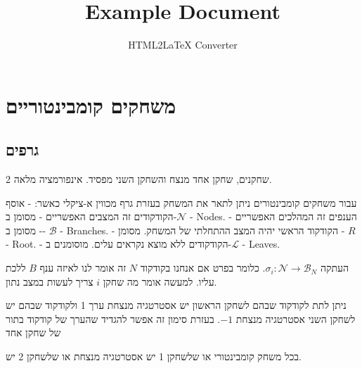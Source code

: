 \documentclass{tstextbook}
\begin{document}
\title{Example Document}
\author{HTML2LaTeX Converter}
\maketitle

\chapter{משחקים קומבינטוריים}

\section{גרפים}

\begin{definition}
2 שחקנים, שחקן אחד מנצח והשחקן השני מפסיד. אינפורמציה מלאה. 

\end{definition}
\begin{proposition}
עבור משחקים קומבינטורים ניתן לתאר את המשחק בעזרת גרף מכווין א-ציקלי כאשר:
- אוסף הקודקודים זה המצבים האפשריים - מסומן ב-\(\mathcal{N}\) - Nodes.
- הענפים זה המהלכים האפשריים - מסומן ב- \(\mathcal{B}\) - Branches.
- הקודקוד הראשי יהיה המצב ההתחלתי של המשחק. מסומן - \(R\) - Root.
- הקודקודים ללא מוצא נקראים עלים. מוסומנים ב-\(\mathcal{L}\) - Leaves.

\end{proposition}
\begin{definition}[אסטרטגיה]
העתקה \(\sigma_{i}:\mathcal{N}\to \mathcal{B}_{N}\). כלומר בפרט אם אנחנו בקודקוד \(N\) זה אומר לנו לאיזה ענף \(B\) ללכת עליו. למעשה אומר מה שחקן \(i\) צריך לעשות במצב נתון.

\end{definition}
\begin{symbolize}
ניתן לתת לקודקוד שבהם לשחקן הראשון יש אסטרטגיה מנצחת ערך 1 ולקודקוד שבהם יש לשחקן השני אסטרטגיה מנצחת \(-1\). בעזרת סימון זה אפשר להגדיד שהערך של קודקוד בתור של שחקן אחד 

\end{symbolize}
\begin{proposition}
בכל משחק קומבינטורי או שלשחקן 1 יש אסטרטגיה מנצחת או שלשחקן 2 יש.

\end{proposition}
\end{document}
